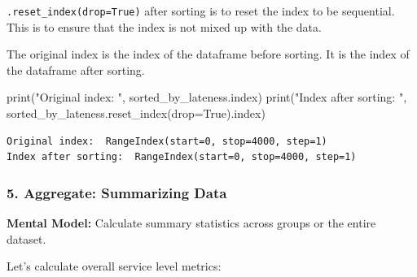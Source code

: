 \documentclass[
]{article}
\newenvironment{Shaded}{\begin{snugshade}}{\end{snugshade}}
\newcommand{\BuiltInTok}[1]{\textcolor[rgb]{0.00,0.23,0.31}{#1}}
\newcommand{\NormalTok}[1]{\textcolor[rgb]{0.00,0.23,0.31}{#1}}
\newcommand{\OperatorTok}[1]{\textcolor[rgb]{0.37,0.37,0.37}{#1}}
\newcommand{\StringTok}[1]{\textcolor[rgb]{0.13,0.47,0.30}{#1}}
\newcommand{\VariableTok}[1]{\textcolor[rgb]{0.07,0.07,0.07}{#1}}
\begin{document}
\texttt{.reset\_index(drop=True)} after sorting is to reset the index to
be sequential. This is to ensure that the index is not mixed up with the
data.

The original index is the index of the dataframe before sorting. It is
the index of the dataframe after sorting.

\begin{Shaded}
\begin{Highlighting}[]
\BuiltInTok{print}\NormalTok{(}\StringTok{"Original index: "}\NormalTok{, sorted\_by\_lateness.index)}
\BuiltInTok{print}\NormalTok{(}\StringTok{"Index after sorting: "}\NormalTok{, sorted\_by\_lateness.reset\_index(drop}\OperatorTok{=}\VariableTok{True}\NormalTok{).index)}
\end{Highlighting}
\end{Shaded}

\begin{verbatim}
Original index:  RangeIndex(start=0, stop=4000, step=1)
Index after sorting:  RangeIndex(start=0, stop=4000, step=1)
\end{verbatim}

\subsubsection{5. Aggregate: Summarizing
Data}\label{aggregate-summarizing-data}

\textbf{Mental Model:} Calculate summary statistics across groups or the
entire dataset.

Let's calculate overall service level metrics:
\end{document}
